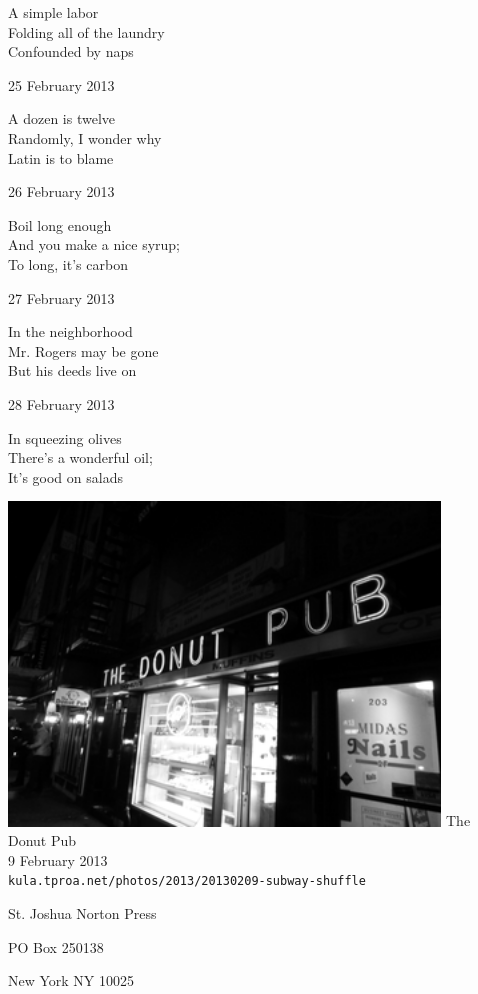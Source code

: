 \documentclass[12pt]{article}
\begin{document}
A simple labor \\
Folding all of the laundry \\
Confounded by naps

25 February 2013

A dozen is twelve \\
Randomly, I wonder why \\
Latin is to blame

26 February 2013

Boil long enough \\
And you make a nice syrup; \\
To long, it's carbon

27 February 2013

In the neighborhood \\
Mr. Rogers may be gone \\
But his deeds live on

28 February 2013

In squeezing olives \\
There's a wonderful oil; \\
It's good on salads


\newpage

\begin{center}
\includegraphics[width=325pt]{doughnut.png}
The Donut Pub \\
9 February 2013 \\
{\tt kula.tproa.net/photos/2013/20130209-subway-shuffle }
\end{center}

\newpage

\thispagestyle{empty}
\vspace*{12cm}
\begin{sideways}
\Large{St. Joshua Norton Press}
\end{sideways}
\begin{sideways}
\Large{PO Box 250138}
\end{sideways}
\begin{sideways}
\Large{New York NY 10025}
\end{sideways}
\end{document}
